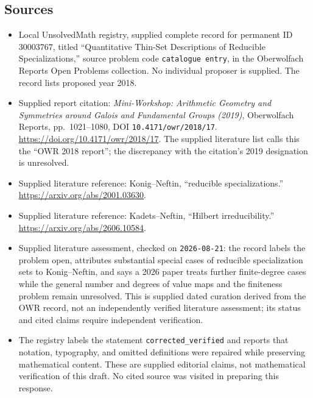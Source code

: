 \documentclass[11pt]{article}
\begin{document}
\subsection{Sources}
\begin{itemize}
\item Local UnsolvedMath registry, supplied complete record for permanent ID \(30003767\), titled ``Quantitative Thin-Set Descriptions of Reducible Specializations,'' source problem code \texttt{catalogue entry}, in the Oberwolfach Reports Open Problems collection. No individual proposer is supplied. The record lists proposed year 2018.
\item Supplied report citation: \emph{Mini-Workshop: Arithmetic Geometry and Symmetries around Galois and Fundamental Groups (2019)}, Oberwolfach Reports, pp.~1021--1080, DOI \texttt{10.4171/owr/2018/17}. \url{https://doi.org/10.4171/owr/2018/17}. The supplied literature list calls this the ``OWR 2018 report''; the discrepancy with the citation's 2019 designation is unresolved.
\item Supplied literature reference: Konig--Neftin, ``reducible specializations.'' \url{https://arxiv.org/abs/2001.03630}.
\item Supplied literature reference: Kadets--Neftin, ``Hilbert irreducibility.'' \url{https://arxiv.org/abs/2606.10584}.
\item Supplied literature assessment, checked on \texttt{2026-08-21}: the record labels the problem open, attributes substantial special cases of reducible specialization sets to Konig--Neftin, and says a 2026 paper treats further finite-degree cases while the general number and degrees of value maps and the finiteness problem remain unresolved. This is supplied dated curation derived from the OWR record, not an independently verified literature assessment; its status and cited claims require independent verification.
\item The registry labels the statement \texttt{corrected\_verified} and reports that notation, typography, and omitted definitions were repaired while preserving mathematical content. These are supplied editorial claims, not mathematical verification of this draft. No cited source was visited in preparing this response.
\end{itemize}
\end{document}

